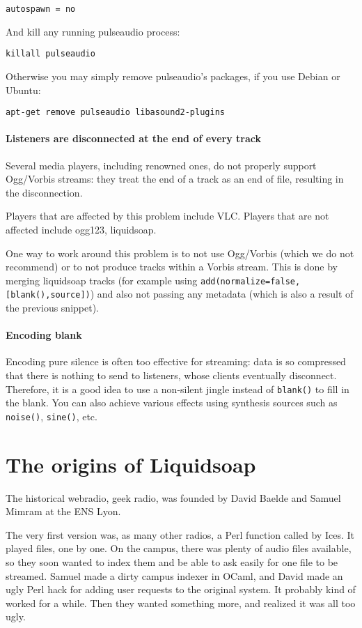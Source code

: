 \documentclass{book}
\begin{document}
\begin{verbatim}
autospawn = no
\end{verbatim}
And kill any running pulseaudio process:

\begin{verbatim}
killall pulseaudio
\end{verbatim}
Otherwise you may simply remove pulseaudio's packages, if you use Debian or
Ubuntu:

\begin{verbatim}
apt-get remove pulseaudio libasound2-plugins
\end{verbatim}

\subsubsection{Listeners are disconnected at the end of every track}
Several media players, including renowned ones, do not properly support
Ogg/Vorbis streams: they treat the end of a track as an end of file, resulting
in the disconnection.

Players that are affected by this problem include VLC.  Players that are not
affected include ogg123, liquidsoap.

One way to work around this problem is to not use Ogg/Vorbis (which we do not
recommend) or to not produce tracks within a Vorbis stream.  This is done by
merging liquidsoap tracks (for example using
\verb+add(normalize=false,[blank(),source])+) and also not passing any metadata
(which is also a result of the previous snippet).

\subsubsection{Encoding blank}
Encoding pure silence is often too effective for streaming: data is so
compressed that there is nothing to send to listeners, whose clients eventually
disconnect. Therefore, it is a good idea to use a non-silent jingle instead of
\verb+blank()+ to fill in the blank. You can also achieve various effects using
synthesis sources such as \verb+noise()+, \verb+sine()+, etc.


\appendix
\chapter{The origins of Liquidsoap}
The historical webradio, geek radio, was founded by David Baelde and Samuel
Mimram at the ENS Lyon.

The very first version was, as many other radios, a Perl function called by
Ices. It played files, one by one. On the campus, there was plenty of audio
files available, so they soon wanted to index them and be able to ask easily for
one file to be streamed. Samuel made a dirty campus indexer in OCaml, and David
made an ugly Perl hack for adding user requests to the original system. It
probably kind of worked for a while. Then they wanted something more, and
realized it was all too ugly.
\end{document}
